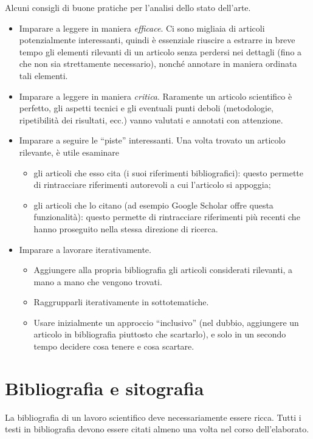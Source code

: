 \documentclass[12pt]{report}
\begin{document}
Alcuni consigli di buone pratiche per l'analisi dello stato dell'arte.
\begin{itemize}
\item Imparare a leggere in maniera {\em efficace}. Ci sono migliaia di articoli potenzialmente interessanti, quindi \`e essenziale riuscire a estrarre in breve tempo gli elementi rilevanti di un articolo senza perdersi nei dettagli (fino a che non sia strettamente necessario), nonch\'e annotare in maniera ordinata tali elementi.
\item Imparare a leggere in maniera {\em critica}. Raramente un articolo scientifico \`e perfetto, gli aspetti tecnici e gli eventuali punti deboli (metodologie, ripetibilit\`a dei risultati, ecc.) vanno valutati e annotati con attenzione.
\item Imparare a seguire le ``piste'' interessanti. Una volta trovato un articolo rilevante, \`e utile esaminare
\begin{itemize}
\item gli articoli che esso cita (i suoi riferimenti bibliografici): questo permette di rintracciare riferimenti autorevoli a cui l'articolo si appoggia;
\item gli articoli che lo citano (ad esempio Google Scholar offre questa funzionalit\`a): questo permette di rintracciare riferimenti pi\`u recenti che hanno proseguito nella stessa direzione di ricerca.
\end{itemize}
\item Imparare a lavorare iterativamente.
\begin{itemize}
\item Aggiungere alla propria bibliografia gli articoli considerati rilevanti, a mano a mano che vengono trovati.
\item Raggrupparli iterativamente in sottotematiche.
\item Usare inizialmente un approccio ``inclusivo'' (nel dubbio, aggiungere un articolo in bibliografia piuttosto che scartarlo), e solo in un secondo tempo decidere cosa tenere e cosa scartare.
\end{itemize}
\end{itemize}



\section{Bibliografia e sitografia}
\label{sec:biblio}

La bibliografia di un lavoro scientifico deve necessariamente essere ricca. Tutti i testi in bibliografia devono essere citati almeno una volta nel corso dell'elaborato. 
\end{document}
